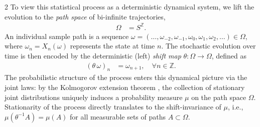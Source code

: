 \documentclass[11pt]{article}
\begin{document}
\begin{multicols}{2}
To view this statistical process as a deterministic dynamical system, we lift the evolution to the {\em path space} of bi-infinite trajectories,
\begin{align}
\Omega &= S^\mathbb{Z}.
\end{align}
An individual sample path is a sequence $\omega = (\ldots, \omega_{-2}, \omega_{-1}, \omega_0, \omega_1, \omega_2, \ldots) \in \Omega$, where $\omega_n = X_n(\omega)$ represents the state at time $n$. The stochastic evolution over time is then encoded by the deterministic (left) {\em shift map} $\theta: \Omega \to \Omega$, defined as
\begin{align}
\label{eq-shift-map}
(\theta\, \omega)_n &= \omega_{n+1}, \quad \forall n \in \mathbb{Z}.
\end{align}
The probabilistic structure of the process enters this dynamical picture via the joint laws: by the Kolmogorov extension theorem \cite{breiman1992probability}, the collection of stationary joint distributions uniquely induces a probability measure $\mu$ on the path space $\Omega$. Stationarity of the process directly translates to the shift-invariance of $\mu$, i.e., $\mu(\theta^{-1} A) = \mu(A)$ for all measurable sets of paths $A \subset \Omega$.





\end{multicols}
\end{document}
